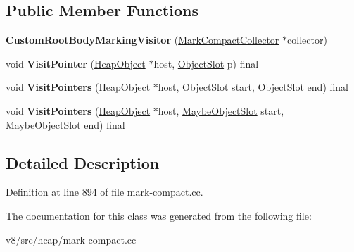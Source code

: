 \subsection*{Public Member Functions}
\begin{DoxyCompactItemize}
\item 
\mbox{\label{classv8_1_1internal_1_1MarkCompactCollector_1_1CustomRootBodyMarkingVisitor_ae037bbace247314c3f474eab73defb45}} 
{\bfseries Custom\+Root\+Body\+Marking\+Visitor} (\mbox{\hyperlink{classv8_1_1internal_1_1MarkCompactCollector}{Mark\+Compact\+Collector}} $\ast$collector)
\item 
\mbox{\label{classv8_1_1internal_1_1MarkCompactCollector_1_1CustomRootBodyMarkingVisitor_a9449ad9c32bf6a2dcb565411a927716b}} 
void {\bfseries Visit\+Pointer} (\mbox{\hyperlink{classv8_1_1internal_1_1HeapObject}{Heap\+Object}} $\ast$host, \mbox{\hyperlink{classv8_1_1internal_1_1ObjectSlot}{Object\+Slot}} p) final
\item 
\mbox{\label{classv8_1_1internal_1_1MarkCompactCollector_1_1CustomRootBodyMarkingVisitor_a14b0cb18c12d63e7127a6c5087683329}} 
void {\bfseries Visit\+Pointers} (\mbox{\hyperlink{classv8_1_1internal_1_1HeapObject}{Heap\+Object}} $\ast$host, \mbox{\hyperlink{classv8_1_1internal_1_1ObjectSlot}{Object\+Slot}} start, \mbox{\hyperlink{classv8_1_1internal_1_1ObjectSlot}{Object\+Slot}} end) final
\item 
\mbox{\label{classv8_1_1internal_1_1MarkCompactCollector_1_1CustomRootBodyMarkingVisitor_abca8fa060b6b1720639c02a357e2cba0}} 
void {\bfseries Visit\+Pointers} (\mbox{\hyperlink{classv8_1_1internal_1_1HeapObject}{Heap\+Object}} $\ast$host, \mbox{\hyperlink{classv8_1_1internal_1_1MaybeObjectSlot}{Maybe\+Object\+Slot}} start, \mbox{\hyperlink{classv8_1_1internal_1_1MaybeObjectSlot}{Maybe\+Object\+Slot}} end) final
\end{DoxyCompactItemize}


\subsection{Detailed Description}


Definition at line 894 of file mark-\/compact.\+cc.



The documentation for this class was generated from the following file\+:\begin{DoxyCompactItemize}
\item 
v8/src/heap/mark-\/compact.\+cc\end{DoxyCompactItemize}
